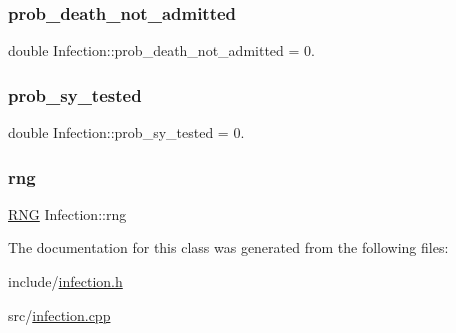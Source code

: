 \subsubsection{\texorpdfstring{prob\+\_\+death\+\_\+not\+\_\+admitted}{prob\_death\_not\_admitted}}
{\footnotesize\ttfamily double Infection\+::prob\+\_\+death\+\_\+not\+\_\+admitted = 0.\hspace{0.3cm}{\ttfamily [protected]}}

\mbox{\label{classInfection_acdbf7c2f72b0ab0938bec8de1ca4e24c}} 
\subsubsection{\texorpdfstring{prob\+\_\+sy\+\_\+tested}{prob\_sy\_tested}}
{\footnotesize\ttfamily double Infection\+::prob\+\_\+sy\+\_\+tested = 0.\hspace{0.3cm}{\ttfamily [protected]}}

\mbox{\label{classInfection_af3737374c3cf12f7d0e78bdd8d95a7d5}} 
\subsubsection{\texorpdfstring{rng}{rng}}
{\footnotesize\ttfamily \hyperlink{classRNG}{R\+NG} Infection\+::rng\hspace{0.3cm}{\ttfamily [protected]}}



The documentation for this class was generated from the following files\+:\begin{DoxyCompactItemize}
\item 
include/\hyperlink{infection_8h}{infection.\+h}\item 
src/\hyperlink{infection_8cpp}{infection.\+cpp}\end{DoxyCompactItemize}
